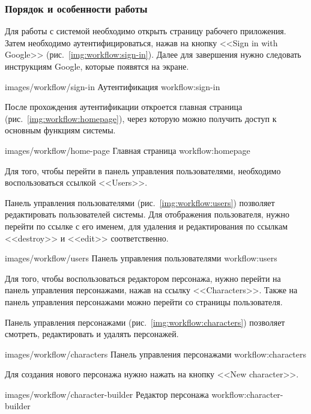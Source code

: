 \subsubsection{Порядок и особенности работы}

Для работы с системой необходимо открыть страницу рабочего приложения. Затем необходимо аутентифицироваться, нажав на кнопку <<Sign in with Google>> (рис.~\ref{img:workflow:sign-in}). Далее для завершения нужно следовать инструкциям Google, которые появятся на экране.

            {images/workflow/sign-in}
            {Аутентификация}
            {workflow:sign-in}

После прохождения аутентификации откроется главная страница (рис.~\ref{img:workflow:homepage}), через которую можно получить доступ к основным функциям системы.

            {images/workflow/home-page}
            {Главная страница}
            {workflow:homepage}

Для того, чтобы перейти в панель управления пользователями, необходимо воспользоваться ссылкой <<Users>>.

Панель управления пользователями (рис.~\ref{img:workflow:users}) позволяет редактировать пользователей системы. Для отображения пользователя, нужно перейти по ссылке с его именем, для удаления и редактирования по ссылкам <<destroy>> и <<edit>> соответственно.

            {images/workflow/users}
            {Панель управления пользователями}
            {workflow:users}

Для того, чтобы воспользоваться редактором персонажа, нужно перейти на панель управления персонажами, нажав на ссылку <<Characters>>. Также на панель управления персонажами можно перейти со страницы пользователя.

Панель управления персонажами (рис.~\ref{img:workflow:characters}) позволяет смотреть, редактировать и удалять персонажей.

            {images/workflow/characters}
            {Панель управления персонажами}
            {workflow:characters}

Для создания нового персонажа нужно нажать на кнопку <<New character>>.

            {images/workflow/character-builder}
            {Редактор персонажа}
            {workflow:character-builder}

